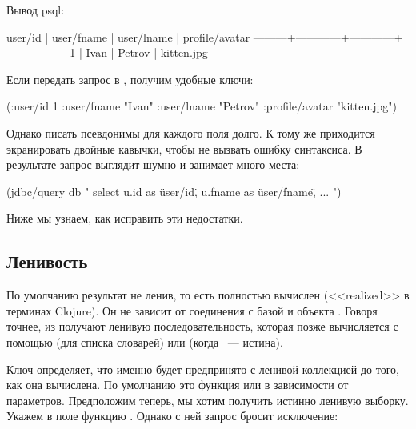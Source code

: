 Вывод psql:

\begin{english}
  \begin{text}
 user/id | user/fname | user/lname | profile/avatar
---------+------------+------------+----------------
       1 | Ivan       | Petrov     | kitten.jpg
  \end{text}
\end{english}

Если передать запрос в , получим удобные ключи:

\begin{english}
  \begin{clojure}
({:user/id 1
  :user/fname "Ivan"
  :user/lname "Petrov"
  :profile/avatar "kitten.jpg"})
  \end{clojure}
\end{english}

Однако писать псевдонимы для каждого поля долго. К тому же приходится экранировать двойные кавычки, чтобы не вызвать ошибку синтаксиса. В результате запрос выглядит шумно и занимает много места:

\begin{english}
  \begin{clojure}
(jdbc/query db "
select
u.id as \"user/id\",
u.fname as \"user/fname\",
...
")
  \end{clojure}
\end{english}

Ниже мы узнаем, как исправить эти недостатки.

\subsection{Ленивость}


По умолчанию результат  не ленив, то есть полностью вычислен (<<realized>> в терминах Clojure). Он не зависит от соединения с базой и объекта . Говоря точнее, из  получают ленивую последовательность, которая позже вычисляется с помощью  (для списка словарей) или  (когда ~--- истина).

Ключ  определяет, что именно будет предпринято с ленивой коллекцией до того, как она вычислена. По умолчанию это функция  или  в зависимости от параметров. Предположим теперь, мы хотим получить истинно ленивую выборку. Укажем в поле  функцию . Однако с ней запрос бросит исключение:

